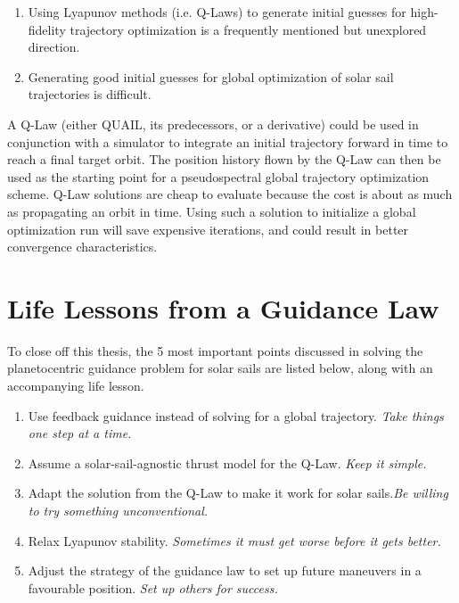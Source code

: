 \begin{enumerate}
    \item Using Lyapunov methods (i.e. Q-Laws) to generate initial guesses for high-fidelity trajectory optimization is a frequently mentioned but unexplored direction.
    \item Generating good initial guesses for global optimization of solar sail trajectories is difficult.
\end{enumerate}

A Q-Law (either QUAIL, its predecessors, or a derivative) could be used in conjunction with a simulator to integrate an initial trajectory forward in time to reach a final target orbit. The position history flown by the Q-Law can then be used as the starting point for a pseudospectral global trajectory optimization scheme. Q-Law solutions are cheap to evaluate because the cost is about as much as propagating an orbit in time. Using such a solution to initialize a global optimization run will save expensive iterations, and could result in better convergence characteristics.

\section{Life Lessons from a Guidance Law}
To close off this thesis, the 5 most important points discussed in solving the planetocentric guidance problem for solar sails are listed below, along with an accompanying life lesson.

\begin{enumerate}
    \item Use feedback guidance instead of solving for a global trajectory. \newline \textit{Take things one step at a time.}
    \item Assume a solar-sail-agnostic thrust model for the Q-Law. \newline \textit{Keep it simple.}
    \item Adapt the solution from the Q-Law to make it work for solar sails.\newline \textit{Be willing to try something unconventional.}
    \item Relax Lyapunov stability. \newline \textit{Sometimes it must get worse before it gets better.}
    \item Adjust the strategy of the guidance law to set up future maneuvers in a favourable position. \newline \textit{Set up others for success.}
\end{enumerate}
